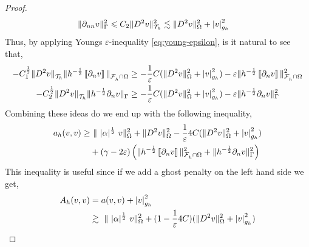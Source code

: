 \begin{proof}
\begin{equation}
\begin{split}
     \|  \partial _{nn}v  \|_{ \Gamma     }^{ 2 } & \leqslant C_{2} \| D^2 v \|_{ \mathcal{T} _{h}  }^{2  } \lesssim    \| D^2 v \|_{ \Omega  }^{ 2 }  + \left\lvert  v  \right\rvert _{ g_{h} }^{2  }
        \end{split}
    \end{equation}
    Thus, by applying Youngs $\varepsilon $-inequality \eqref{eq:young-epsilon}, is it natural to see that,
    \begin{equation}
        \begin{split}
- C_{1}^{\frac{1}{2}} \| D^2 v    \|_{ \mathcal{T} _{h}   }^{  }  \|h^{-\frac{1}{2}} \left[\!\left[  \partial _{n} v  \right]\!\right]   \|_{ \mathcal{F}^{}_{h}\cap \Omega   }^{  }
& \ge - \frac{1}{\varepsilon } C  (\| D^2 v \|_{ \Omega  }^{ 2 }  + \left\lvert  v  \right\rvert _{ g_{h} }^{2  } ) -  \varepsilon \|h^{-\frac{1}{2}} \left[\!\left[  \partial _{n} v  \right]\!\right]   \|_{ \mathcal{F}^{}_{h}\cap \Omega   }^{2  } \\
- C_{2}^{\frac{1}{2}}  \| D^2 v \|_{ \mathcal{T} _{h} }^{  } \| h^{-\frac{1}{2}}  \partial _{n} v    \|_{ \Gamma    }^{  }
& \ge - \frac{1}{\varepsilon } C  (\| D^2 v \|_{ \Omega  }^{ 2 }  + \left\lvert  v  \right\rvert _{ g_{h} }^{2  } ) -  \varepsilon \|h^{-\frac{1}{2}}  \partial _{n} v    \|_{ \Gamma    }^{2  } \\
        \end{split}
    \end{equation}
    Combining these ideas do we end up with the following inequality,
    \begin{equation}
    \begin{split}
       a_{h}( v,v)  \ge& \     \|\ |\alpha|^{\frac{1}{2}} \  v  \|_{   \Omega   }^{2} +\| D^2v  \|_{   \Omega   }^{2} -  \frac{1}{\varepsilon } 4C  (\| D^2 v \|_{ \Omega  }^{ 2 }  + \left\lvert  v  \right\rvert _{ g_{h} }^{2  } )  \\
                       & + (\gamma - 2\varepsilon  )\left( \|h^{-\frac{1}{2}}  \left[\!\left[  \partial _{n} v  \right]\!\right]\|_{\mathcal{F} _{h}^{} \cap \Omega   }^{ 2 } + \| h^{-\frac{1}{2}} \partial _{n} v \|_{ \Gamma  }^{ 2} \right)        \\
    \end{split}
    \end{equation}
    This inequality is useful since if we add a ghost penalty on the left hand side we get,
    \begin{equation}
        \begin{split}
     A_{h}( v,v) & = a( v,v) + \abs{ v }_{g_{h}}^{2} \\
     & \gtrsim    \   \| \ |\alpha|^{\frac{1}{2}} \  v  \|_{   \Omega   }^{2} + (1  - \frac{1}{\varepsilon } 4C)  (\| D^2 v \|_{ \Omega  }^{ 2 }  + \abs{ v } _{ g_{h} }^{2  } )  \\

\end{split}
\end{equation}
\end{proof}
